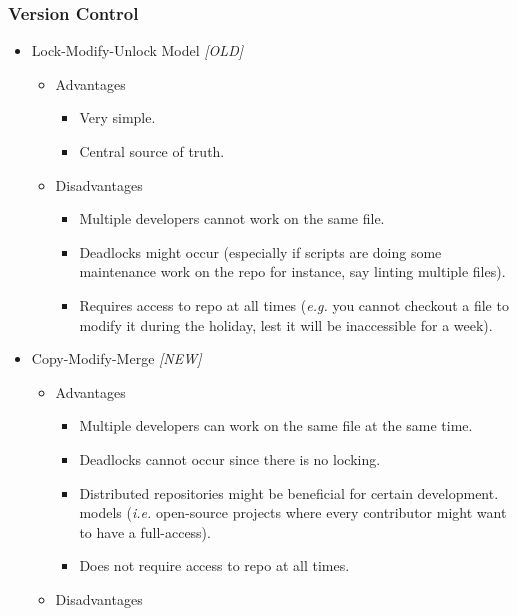 \documentclass[a4paper]{article}
\providecommand{\tightlist}{%
  \setlength{\itemsep}{0pt}\setlength{\parskip}{0pt}}
\begin{document}
\hypertarget{version-control}{%
\subsubsection{Version Control}\label{version-control}}

\begin{itemize}
\item
  Lock-Modify-Unlock Model \emph{{[}OLD{]}}

  \begin{itemize}
  \item
    Advantages

    \begin{itemize}
    \tightlist
    \item
      Very simple.
    \item
      Central source of truth.
    \end{itemize}
  \item
    Disadvantages

    \begin{itemize}
    \tightlist
    \item
      Multiple developers cannot work on the same file.
    \item
      Deadlocks might occur (especially if scripts are doing some
      maintenance work on the repo for instance, say linting multiple
      files).
    \item
      Requires access to repo at all times (\emph{e.g.} you cannot
      checkout a file to modify it during the holiday, lest it will be
      inaccessible for a week).
    \end{itemize}
  \end{itemize}
\item
  Copy-Modify-Merge \emph{{[}NEW{]}}

  \begin{itemize}
  \item
    Advantages

    \begin{itemize}
    \tightlist
    \item
      Multiple developers can work on the same file at the same time.
    \item
      Deadlocks cannot occur since there is no locking.
    \item
      Distributed repositories might be beneficial for certain
      development. models (\emph{i.e.} open-source projects where every
      contributor might want to have a full-access).
    \item
      Does not require access to repo at all times.
    \end{itemize}
  \item
    Disadvantages


\end{itemize}
\end{itemize}
\end{document}
